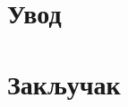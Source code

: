 \documentclass[12pt,oneside]{memoir}
\begin{document}
\frontmatter
\naslovna
\komisija
{}
\tableofcontents*

\mainmatter

\chapter{Увод}

\chapter{Закључак}

\literatura

\end{document}
